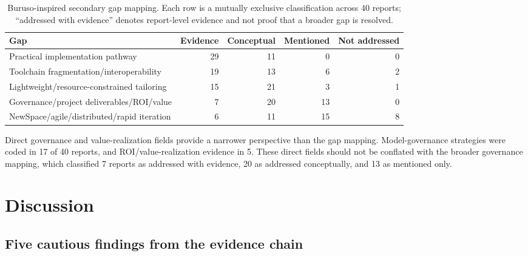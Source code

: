 \documentclass[alpha-refs]{wiley-article}
\begin{document}
\begin{table}[tbp]
\centering
\small
\caption{Buruso-inspired secondary gap mapping.  Each row is a mutually exclusive classification across 40 reports; ``addressed with evidence'' denotes report-level evidence and not proof that a broader gap is resolved.}
\label{tab:gap-mapping}
\begin{tabular}{>{\raggedright\arraybackslash}p{}rrrr}
\toprule
Gap & Evidence & Conceptual & Mentioned & Not addressed \\
\midrule
Practical implementation pathway & 29 & 11 & 0 & 0 \\
Toolchain fragmentation/interoperability & 19 & 13 & 6 & 2 \\
Lightweight/resource-constrained tailoring & 15 & 21 & 3 & 1 \\
Governance/project deliverables/ROI/value & 7 & 20 & 13 & 0 \\
NewSpace/agile/distributed/rapid iteration & 6 & 11 & 15 & 8 \\
\bottomrule
\end{tabular}
\end{table}

Direct governance and value-realization fields provide a narrower perspective than the gap mapping.  Model-governance strategies were coded in 17 of 40 reports, and ROI/value-realization evidence in 5.  These direct fields should not be conflated with the broader governance mapping, which classified 7 reports as addressed with evidence, 20 as addressed conceptually, and 13 as mentioned only.

\FloatBarrier
\section{Discussion}
\label{sec:discussion}

\subsection{Five cautious findings from the evidence chain}
\end{document}
